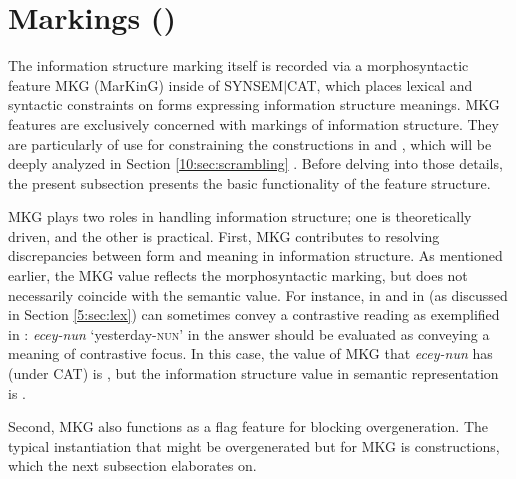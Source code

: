 \section{Markings \textnormal{(}\textnormal{)}}
\label{9:ssec:mkg}

The information structure marking itself is recorded via a
morphosyntactic feature MKG (MarKinG) inside
of \mbox{SYNSEM{$\mid$}CAT}, which places lexical and syntactic
constraints on forms expressing information structure meanings.  MKG
features are exclusively concerned with markings of information
structure. They are particularly of use for constraining the
 constructions in  and ,
which will be deeply analyzed in Section \ref{10:sec:scrambling}
  . Before delving into those details, the
  present subsection presents the basic functionality of the feature
  structure.


MKG plays two roles in handling information structure; one is
theoretically driven, and the other is practical.  First, MKG
contributes to resolving discrepancies between form and meaning in
information structure. As mentioned earlier, the MKG value reflects
the morphosyntactic marking, but does not necessarily coincide with
the semantic value.  For instance, \wa in  and \nun in
 (as discussed in Section \ref{5:sec:lex}) can sometimes convey a
contrastive  reading as exemplified in :
\textit{ecey-nun} `yesterday-\textsc{nun}' in the answer should be
evaluated as conveying a meaning of contrastive focus.  In this case,
the value of MKG that \textit{ecey-nun} has (under CAT) is ,
but the information structure value in semantic representation is
.



\noindent Second, MKG also functions as a flag feature for blocking
overgeneration.  The typical instantiation that might be overgenerated
but for MKG is  constructions, which the next
subsection elaborates on.


